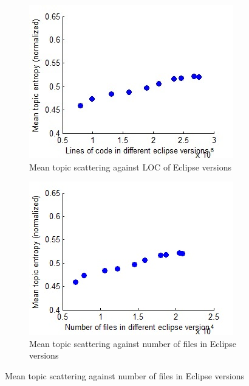 \documentclass[12pt]{article}
\begin{document}
\begin{figure}
        \centering
        \begin{subfigure}[b]{0.5\textwidth}
                \centering
                \includegraphics[width=\textwidth]{mean-scattering-vs-loc-eclipse.jpg}
                \caption{Mean topic scattering against LOC of Eclipse versions}
                \label{scatter1}
        \end{subfigure}%
        \begin{subfigure}[b]{0.5\textwidth}
                \centering
                \includegraphics[width=\textwidth]{mean-scattering-vs-num-files-eclipse.jpg}
                \caption{Mean topic scattering against number of files in Eclipse versions}

\end{subfigure}
\end{figure}
\end{document}
